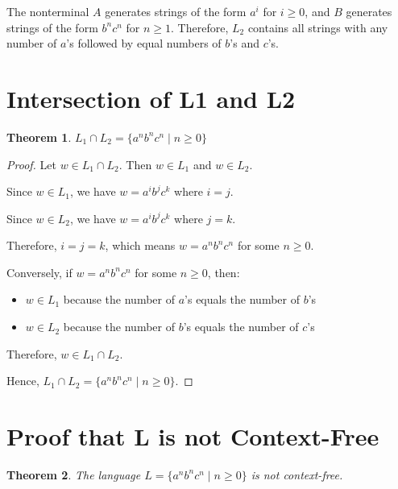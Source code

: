 \documentclass[12pt]{article}
\newtheorem{theorem}{Theorem}
\begin{document}
The nonterminal $A$ generates strings of the form $a^i$ for $i \geq 0$, and $B$ generates strings of the form $b^n c^n$ for $n \geq 1$. Therefore, $L_2$ contains all strings with any number of $a$'s followed by equal numbers of $b$'s and $c$'s.

\section{Intersection of L1 and L2}

\begin{theorem}
$L_1 \cap L_2 = \{a^n b^n c^n \mid n \geq 0\}$
\end{theorem}

\begin{proof}
Let $w \in L_1 \cap L_2$. Then $w \in L_1$ and $w \in L_2$.

Since $w \in L_1$, we have $w = a^i b^j c^k$ where $i = j$.

Since $w \in L_2$, we have $w = a^i b^j c^k$ where $j = k$.

Therefore, $i = j = k$, which means $w = a^n b^n c^n$ for some $n \geq 0$.

Conversely, if $w = a^n b^n c^n$ for some $n \geq 0$, then:
\begin{itemize}
\item $w \in L_1$ because the number of $a$'s equals the number of $b$'s
\item $w \in L_2$ because the number of $b$'s equals the number of $c$'s
\end{itemize}

Therefore, $w \in L_1 \cap L_2$.

Hence, $L_1 \cap L_2 = \{a^n b^n c^n \mid n \geq 0\}$.
\end{proof}

\section{Proof that L is not Context-Free}

\begin{theorem}
The language $L = \{a^n b^n c^n \mid n \geq 0\}$ is not context-free.
\end{theorem}
\end{document}
